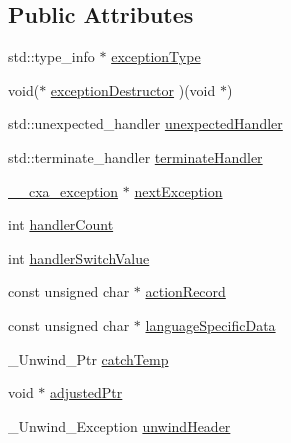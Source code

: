 \subsection*{Public Attributes}
\begin{DoxyCompactItemize}
\item 
std\-::type\-\_\-info $\ast$ \hyperlink{struct____cxxabiv1_1_1____cxa__exception_ac64ad06829436c50fb5fb7c313e26866}{exception\-Type}
\item 
void($\ast$ \hyperlink{struct____cxxabiv1_1_1____cxa__exception_a1879a475548b2b52a017ed3007fd173d}{exception\-Destructor} )(void $\ast$)
\item 
std\-::unexpected\-\_\-handler \hyperlink{struct____cxxabiv1_1_1____cxa__exception_a54eaa8792b9d70a6fba263bc4098ccde}{unexpected\-Handler}
\item 
std\-::terminate\-\_\-handler \hyperlink{struct____cxxabiv1_1_1____cxa__exception_a95e8ed26809a82a5b1d404742665f12c}{terminate\-Handler}
\item 
\hyperlink{struct____cxxabiv1_1_1____cxa__exception}{\-\_\-\-\_\-cxa\-\_\-exception} $\ast$ \hyperlink{struct____cxxabiv1_1_1____cxa__exception_a8e5735018d1716ce01ad2da8ee8b6cd3}{next\-Exception}
\item 
int \hyperlink{struct____cxxabiv1_1_1____cxa__exception_a8fd8db34da0b3179081bfd6959a5a80a}{handler\-Count}
\item 
int \hyperlink{struct____cxxabiv1_1_1____cxa__exception_a98f471d3a99012797f9037e217aee520}{handler\-Switch\-Value}
\item 
const unsigned char $\ast$ \hyperlink{struct____cxxabiv1_1_1____cxa__exception_a5f946776edf58b5b8c3566b5f408d811}{action\-Record}
\item 
const unsigned char $\ast$ \hyperlink{struct____cxxabiv1_1_1____cxa__exception_a57fea26051378a6a5f5c239f5b86b06f}{language\-Specific\-Data}
\item 
\-\_\-\-Unwind\-\_\-\-Ptr \hyperlink{struct____cxxabiv1_1_1____cxa__exception_ad27f857d1fe7e865672e96fc2549955d}{catch\-Temp}
\item 
void $\ast$ \hyperlink{struct____cxxabiv1_1_1____cxa__exception_a8bbedb8ce8835dd97247dce153ccf281}{adjusted\-Ptr}
\item 
\-\_\-\-Unwind\-\_\-\-Exception \hyperlink{struct____cxxabiv1_1_1____cxa__exception_af6f09c0335f5982eb75942fc2c2abdd4}{unwind\-Header}
\end{DoxyCompactItemize}


